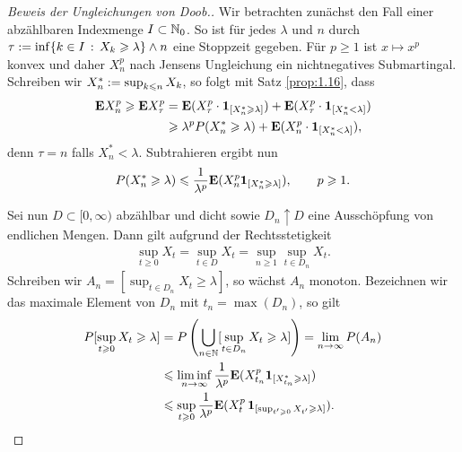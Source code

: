 \begin{proof}[Beweis der Ungleichungen von Doob.]
Wir betrachten zunächst den Fall einer abzählbaren Indexmenge
$I\subset\mathbb{N}_0$. So ist für jedes $\lambda$ und $n$ durch $\tau \defl \inf
\setdef{k\in I}{X_k \ge \lambda}\wedge n$ eine Stoppzeit gegeben.
Für $p \ge 1$ ist
$x\mapsto x^p$ konvex und daher $X_n^p$ nach Jensens Ungleichung ein
nichtnegatives Submartingal.
Schreiben wir $X_n^* := \sup_{k\leqslant n} X_k$, so folgt mit Satz
\ref{prop:1.16}, dass
\begin{align*}
\mathbf{E} X_n^p \geqslant \mathbf{E} X_\tau^p  &= 
\mathbf{E} (X_\tau^p\cdot \mathbf{1}_{[X_n^* \geqslant \lambda]})
+
\mathbf{E} (X_\tau^p\cdot \mathbf{1}_{[X_n^* < \lambda]})\\
&\geqslant \lambda^p P(X_n^* \geqslant \lambda)
+
\mathbf{E} (X_n^p\cdot \mathbf{1}_{[X_n^* < \lambda]}),
\end{align*}
denn $\tau = n$ falls $X_n^* < \lambda$. Subtrahieren ergibt nun
\begin{align*}
 P(X_n^* \geqslant \lambda) \leqslant \frac{1}{\lambda^p}
\mathbf{E} (X_n^p \mathbf{1}_{[X_n^*\geqslant \lambda]}),\qquad p\geqslant 1.
\end{align*}

Sei nun $D\subset [0,\infty)$ abzählbar und dicht sowie $D_n\uparrow D$
eine Ausschöpfung von endlichen Mengen. Dann gilt aufgrund der Rechtsstetigkeit
\begin{align*}
\sup_{t\ge 0} X_t = \sup_{t\in D} X_t =
\sup_{n\ge 1}\sup_{t\in D_n} X_t.
\end{align*}
Schreiben wir $A_n = [\sup_{t\in D_n} X_t \ge \lambda]$, so wächst $A_n$
monoton. Bezeichnen wir das maximale Element von $D_n$ mit $t_n = \max(D_n)$, so
gilt
\begin{align*}
P[\sup_{t\geqslant 0} X_t\geqslant \lambda] &= P
\left(\bigcup_{n\in\mathbb{N}} [\sup_{t\in D_n} X_t \geqslant \lambda]\right)
= 
\lim\limits_{n\to \infty} P(A_n)\\
&\leqslant
\liminf_{n\to\infty} \frac{1}{\lambda^p} \mathbf{E}(X_{t_n}^p \mathbf{1}_{[X_{t_n}^* \geqslant
\lambda]})\\
&\leqslant \sup_{t\geqslant 0} \frac{1}{\lambda^p} \mathbf{E}(X_{t}^p\, \mathbf{1}_{[\sup_{t'\geqslant
0} X_{t'} \geqslant \lambda]}).
\end{align*}


\end{proof}
